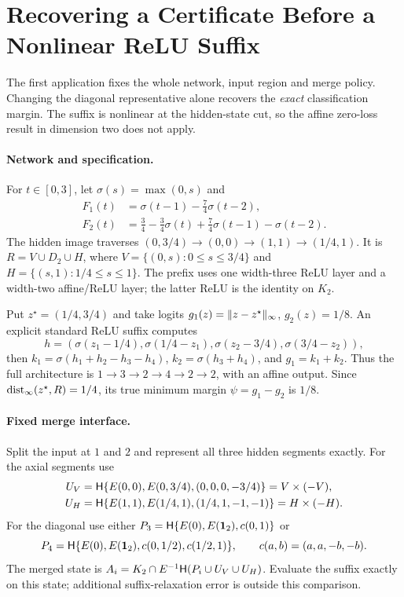 \section{Recovering a Certificate Before a Nonlinear ReLU Suffix}\label{sec:nonlinear-application}
The first application fixes the whole network, input region and merge policy. Changing the diagonal representative alone recovers the \emph{exact} classification margin. The suffix is nonlinear at the hidden-state cut, so the affine zero-loss result in dimension two does not apply.

\paragraph{Network and specification.}
For $t\in[0,3]$, let $\sigma(s)=\max(0,s)$ and
\begin{align*}
F_1(t)&=\sigma(t-1)-\tfrac74\sigma(t-2),\\
F_2(t)&=\tfrac34-\tfrac34\sigma(t)+\tfrac74\sigma(t-1)-\sigma(t-2).
\end{align*}
The hidden image traverses $(0,3/4)\to(0,0)\to(1,1)\to(1/4,1)$. It is $R=V\cup D_2\cup H$, where $V=\{(0,s):0\le s\le3/4\}$ and $H=\{(s,1):1/4\le s\le1\}$. The prefix uses one width-three ReLU layer and a width-two affine/ReLU layer; the latter ReLU is the identity on $K_2$.

Put $z^\star=(1/4,3/4)$ and take logits $g_1(z)=\lVert z-z^\star\rVert_\infty$, $g_2(z)=1/8$. An explicit standard ReLU suffix computes
\[
h=(\sigma(z_1-1/4),\sigma(1/4-z_1),\sigma(z_2-3/4),\sigma(3/4-z_2)),
\]
then $k_1=\sigma(h_1+h_2-h_3-h_4)$, $k_2=\sigma(h_3+h_4)$, and $g_1=k_1+k_2$. Thus the full architecture is $1\to3\to2\to4\to2\to2$, with an affine output. Since $\operatorname{dist}_\infty(z^\star,R)=1/4$, its true minimum margin $\psi=g_1-g_2$ is $1/8$.

\paragraph{Fixed merge interface.}
Split the input at $1$ and $2$ and represent all three hidden segments exactly. For the axial segments use
\begin{align*}
U_V&=\mathsf H\{E(0,0),E(0,3/4),(0,0,0,-3/4)\}=V\times(-V),\\
U_H&=\mathsf H\{E(1,1),E(1/4,1),(1/4,1,-1,-1)\}=H\times(-H).
\end{align*}
For the diagonal use either $P_3=\mathsf H\{E(0),E(\mathbf 1_2),c(0,1)\}$ or
\[
P_4=\mathsf H\{E(0),E(\mathbf 1_2),c(0,1/2),c(1/2,1)\},\qquad
c(a,b)=(a,a,-b,-b).
\]
The merged state is $A_i=K_2\cap E^{-1}\mathsf H(P_i\cup U_V\cup U_H)$. Evaluate the suffix exactly on this state; additional suffix-relaxation error is outside this comparison.

